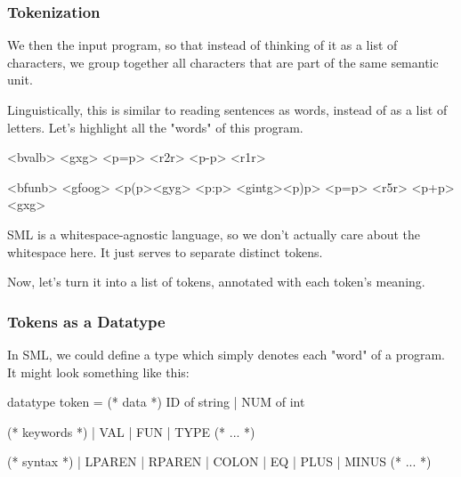 \documentclass[aspectratio=169, handout]{beamer}
\begin{document}
\begin{frame}[fragile]
  \frametitle{Tokenization}

  We then  the input program, so that instead of thinking of it
  as a list of characters, we group together all characters that are part of
  the same semantic unit.

  \pause
  \vspace{\fill}

  Linguistically, this is similar to reading sentences as words, instead of as
  a list of letters. Let's highlight all the "words" of this program.

  \pause
  \vspace{\fill}

  \begin{codeblock}[keywordstyle=, morekeywords={}]
    <bvalb> <gxg> <p=p> <r2r> <p-p> <r1r>

    <bfunb> <gfoog> <p(p><gyg> <p:p> <gintg><p)p> <p=p> <r5r> <p+p> <gxg>
  \end{codeblock}

  \pause
  \vspace{\fill}

  SML is a whitespace-agnostic language, so we don't actually care about
  the whitespace here. It just serves to separate distinct tokens.

  \pause
  \vspace{\fill}

  Now, let's turn it into a list of tokens, annotated with each token's meaning.
\end{frame}

\begin{frame}[fragile]
  \frametitle{Tokens as a Datatype}

  \tgs

  In SML, we could define a type  which simply denotes each
  "word" of a program. It might look something like this:

  \pause
  \begin{codeblock}
    datatype token =
      (* data *)
        ID of string | NUM of int

      (* keywords *)
      | VAL | FUN | TYPE (* ... *)

      (* syntax *)
      | LPAREN | RPAREN | COLON | EQ | PLUS | MINUS
      (* ... *)
  \end{codeblock}
\end{frame}
\end{document}
